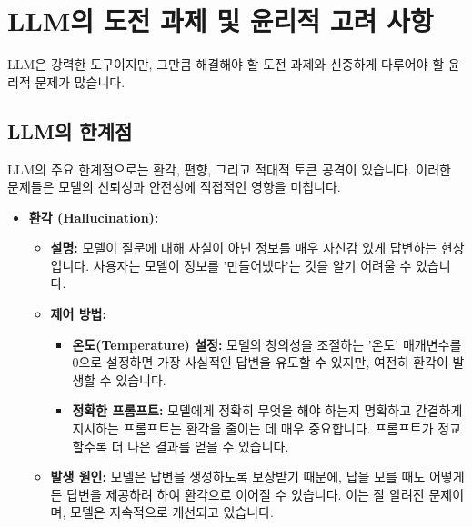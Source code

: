 \documentclass[11pt,a4paper]{article}
\begin{document}
\newpage
\section{LLM의 도전 과제 및 윤리적 고려 사항}

LLM은 강력한 도구이지만, 그만큼 해결해야 할 도전 과제와 신중하게 다루어야 할 윤리적 문제가 많습니다.

\subsection{LLM의 한계점}

LLM의 주요 한계점으로는 환각, 편향, 그리고 적대적 토큰 공격이 있습니다. 이러한 문제들은 모델의 신뢰성과 안전성에 직접적인 영향을 미칩니다.

\begin{itemize}
    \item \textbf{환각 (Hallucination):}
    \begin{itemize}
        \item \textbf{설명:} 모델이 질문에 대해 사실이 아닌 정보를 매우 자신감 있게 답변하는 현상입니다. 사용자는 모델이 정보를 '만들어냈다'는 것을 알기 어려울 수 있습니다.
        \item \textbf{제어 방법:}
        \begin{itemize}
            \item \textbf{온도(Temperature) 설정:} 모델의 창의성을 조절하는 '온도' 매개변수를 0으로 설정하면 가장 사실적인 답변을 유도할 수 있지만, 여전히 환각이 발생할 수 있습니다.
            \item \textbf{정확한 프롬프트:} 모델에게 정확히 무엇을 해야 하는지 명확하고 간결하게 지시하는 프롬프트는 환각을 줄이는 데 매우 중요합니다. 프롬프트가 정교할수록 더 나은 결과를 얻을 수 있습니다.
        \end{itemize}
        \item \textbf{발생 원인:} 모델은 답변을 생성하도록 보상받기 때문에, 답을 모를 때도 어떻게든 답변을 제공하려 하여 환각으로 이어질 수 있습니다. 이는 잘 알려진 문제이며, 모델은 지속적으로 개선되고 있습니다.
    \end{itemize}


\end{itemize}
\end{document}
